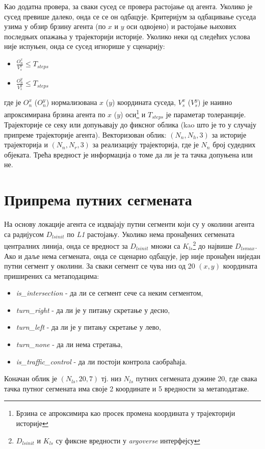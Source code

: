 \documentclass[11pt,oneside]{memoir}
\begin{document}
Као додатна провера, за сваки сусед се провера растојање од агента. Уколико је сусед превише далеко, онда се се он одбацује.
Критеријум за одбацивање суседа узима у обзир брзину агента (по $x$ и $y$ оси одвојено) и растојање њихових последњих опажања
у трајекторији историје. Уколико неки од следећих услова није
испуњен, онда се сусед игнорише у сценарију: 
\begin{itemize}
  \item $\frac{O_n^x}{V_s^x} \leq T_{steps}$
  \item $\frac{O_n^y}{V_s^y} \leq T_{steps}$
\end{itemize}
где је $O_n^x$ ($O_n^y$) нормализована $x$ ($y$) координата суседа, $V_s^x$ ($V_s^y$) је наивно 
апроксимирана брзина агента
по $x$ ($y$) оси\footnote{Брзина се апроксимира као просек промена координата у трајекторији историје} и $T_{steps}$ је параметар толеранције.
Трајекторије се секу или допуњавају до фиксног облика (kao што је то у случају припреме трајекторије агента). 
Векторизован облик: $(N_n, N_h, 3)$ за историје трајекторија и $(N_n, N_r, 3)$ за реализацију трајекторија, где је $N_n$ број судедних објеката. 
Трећа вредност је информација о томе да ли је та тачка допуњена или не.

\section{Припрема путних сегмената}

На основу локације агента се издвајају путни сегменти који су у околини агента са радијусом $D_{lsinit}$ по \textit{L1} растојању. Уколико нема
пронађених сегмената централних линија, онда се вредност за $D_{lsinit}$ множи са $K_{ls}$\footnote{$D_{lsinit}$ и $K_{ls}$ су фиксне вредности
у \textit{argoverse} интерфејсу} до највише $D_{lsmax}$. Ако и даље нема сегмената, 
онда се сценарио одбацује, јер није пронађен ниједан путни сегмент у околини. 
За сваки сегмент се чува низ од 20 $(x, y)$ координата приширених са метаподацима:
\begin{itemize} 
  \item \textit{is\_intersection} - да ли се сегмент сече са неким сегментом,
  \item \textit{turn\_right} - да ли је у питању скретање у десно, 
  \item \textit{turn\_left} - да ли је у питању скретање у лево, 
  \item \textit{turn\_none} - да ли нема стретања, 
  \item \textit{is\_traffic\_control} - да ли постоји контрола саобраћаја. 
\end{itemize}
Коначан облик је $(N_{ls}, 20, 7)$ тј. низ $N_{ls}$ путних сегмената дужине 20, где свака тачка путног сегмената има своје 2 координате
и 5 вредности за метаподатаке. 
\end{document}
